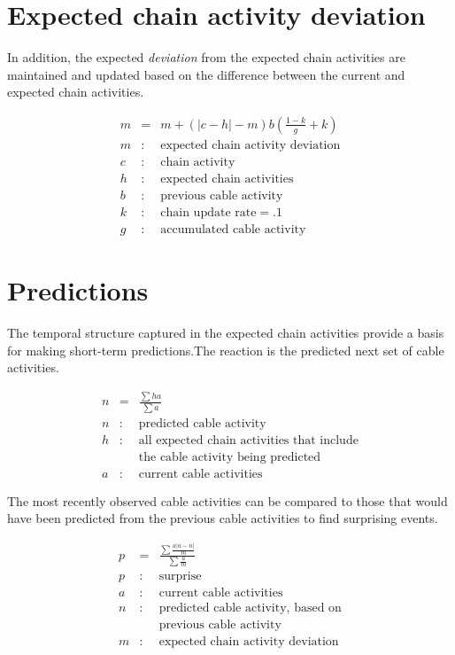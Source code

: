\documentclass[oneside,twocolumn]{article}
\begin{document}
\section*{\color{copper} Expected chain activity deviation}

In addition, the expected {\em deviation} from the expected chain activities are maintained and updated based on the difference between the current and expected chain activities. 

\begin{eqnarray*}
m &= & m + (|c-h|-m) b \left ( \frac{1 - k}{g} + k \right)\\ 
m &:& \mbox{expected chain activity deviation} \\
c &:& \mbox{chain activity} \\
h &:& \mbox{expected chain activities} \\
b &:& \mbox{previous cable activity} \\
k &:& \mbox{chain update rate} = .1 \\
g &:& \mbox{accumulated cable activity}
\end{eqnarray*}

\section*{\color{copper} Predictions}

The temporal structure captured in the expected chain activities provide a basis for making short-term predictions.The reaction is the predicted next set of cable activities. 

\begin{eqnarray*}
n &= & \frac{\sum h a}{\sum{a}} \\
n &:& \mbox{predicted cable activity} \\
h &:& \mbox{all expected chain activities that include} \\
&& \mbox{the cable activity being predicted} \\
a &:& \mbox{current cable activities}
\end{eqnarray*}

The most recently observed cable activities can be compared to those that would have been predicted from the previous cable activities to find surprising events.

\begin{eqnarray*}
p &= &  \frac{\sum \frac{a | a - n |}{m}}{\sum{\frac{a}{m}}} \\
p &:& \mbox{surprise} \\
a &:& \mbox{current cable activities} \\
n &:& \mbox{predicted cable activity, based on} \\
&& \mbox{previous cable activity} \\
m &:& \mbox{expected chain activity deviation} 
\end{eqnarray*}
\end{document}
